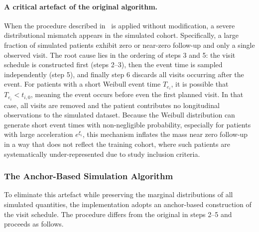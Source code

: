 \documentclass{rapportCS}
\begin{document}
\paragraph{A critical artefact of the original algorithm.}
When the procedure described in~\cite{ortholand2025joint} is applied without modification, a severe distributional mismatch appears in the simulated cohort. Specifically, a large fraction of simulated patients exhibit zero or near-zero follow-up and only a single observed visit. The root cause lies in the ordering of steps 3 and 5: the visit schedule is constructed first (steps 2--3), then the event time is sampled independently (step 5), and finally step 6 discards all visits occurring after the event. For patients with a short Weibull event time $T_{e_i}$, it is possible that $T_{e_i} < t_{i,0}$, meaning the event occurs before even the first planned visit. In that case, all visits are removed and the patient contributes no longitudinal observations to the simulated dataset. Because the Weibull distribution can generate short event times with non-negligible probability, especially for patients with large acceleration $e^{\xi_i}$, this mechanism inflates the mass near zero follow-up in a way that does not reflect the training cohort, where such patients are systematically under-represented due to study inclusion criteria.

\subsubsection{The Anchor-Based Simulation Algorithm}
To eliminate this artefact while preserving the marginal distributions of all simulated quantities, the implementation adopts an anchor-based construction of the visit schedule. The procedure differs from the original in steps 2--5 and proceeds as follows.
\end{document}

